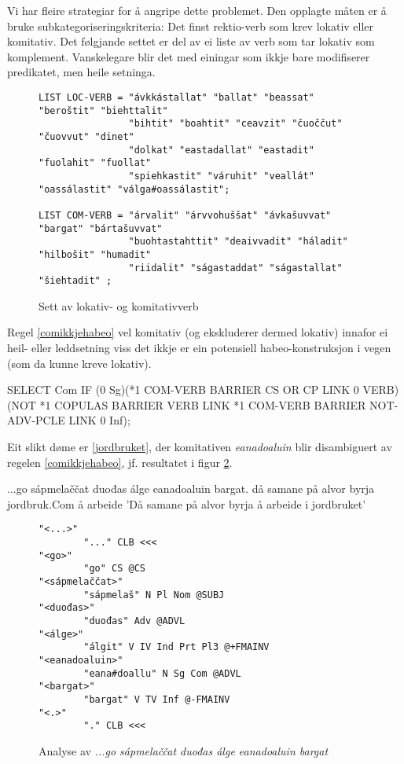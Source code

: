 \documentclass[a4paper,norsk]{article}
\begin{document}
Vi har fleire strategiar for å angripe dette problemet. Den opplagte måten er å bruke subkategoriseringskriteria: Det finst rektio-verb som krev lokativ eller komitativ. Det følgjande settet er del av ei liste av verb som tar lokativ som komplement. Vanskelegare blir det med einingar som ikkje bare modifiserer predikatet, men heile setninga. %

\begin{figure}[htbp]
\begin{center}
\begin{verbatim}
LIST LOC-VERB = "ávkkástallat" "ballat" "beassat" "beroštit" "biehttalit"
			 	"bihtit" "boahtit" "ceavzit" "čuoččut" "čuovvut" "dinet" 
			 	"dolkat" "eastadallat" "eastadit" "fuolahit" "fuollat" 
			 	"spiehkastit" "váruhit" "veallát" "oassálastit" "válga#oassálastit";
			 	
LIST COM-VERB = "árvalit" "árvvohuššat" "ávkašuvvat" "bargat" "bártašuvvat"
 				"buohtastahttit" "deaivvadit" "háladit" "hilbošit" "humadit"
 				"riidalit" "ságastaddat" "ságastallat" "šiehtadit" ;
\end{verbatim}
\caption{Sett av lokativ- og komitativverb}
\label{loccomverb}
\end{center}
\end{figure}

Regel \ref{comikkjehabeo} vel komitativ (og ekskluderer dermed lokativ) innafor ei heil- eller leddsetning viss det ikkje er ein potensiell habeo-konstruksjon i vegen (som da kunne kreve lokativ). %

\begin{example}\label{comikkjehabeo}
SELECT Com IF (0 Sg)(*1 COM-VERB BARRIER CS OR CP LINK 0 VERB)
	(NOT *1 COPULAS BARRIER VERB LINK *1 COM-VERB BARRIER NOT-ADV-PCLE 
	LINK 0 Inf);    
\end{example}

Eit slikt døme er \ref{jordbruket}, der komitativen \emph{eanadoaluin} blir disambiguert av regelen \ref{comikkjehabeo}, jf. resultatet i figur \ref{comverbana}.%

\begin{example}\label{jordbruket}
\gll ...go sápmelaččat duođas álge eanadoaluin bargat.
     då samane {på alvor} byrja jordbruk.Com {å arbeide}
\glt 'Då samane på alvor byrja å arbeide i jordbruket'
\glend     
\end{example}

\begin{figure}[htbp]
\begin{center}
\begin{verbatim}
"<...>"
        "..." CLB <<<
"<go>"
        "go" CS @CS
"<sápmelaččat>"
        "sápmelaš" N Pl Nom @SUBJ
"<duođas>"
        "duođas" Adv @ADVL
"<álge>"
        "álgit" V IV Ind Prt Pl3 @+FMAINV
"<eanadoaluin>"
        "eana#doallu" N Sg Com @ADVL
"<bargat>"
        "bargat" V TV Inf @-FMAINV
"<.>"
        "." CLB <<<
\end{verbatim}
\caption{Analyse av \textit{...go sápmelaččat duođas álge eanadoaluin bargat}}
\label{comverbana}
\end{center}
\end{figure}
\end{document}
